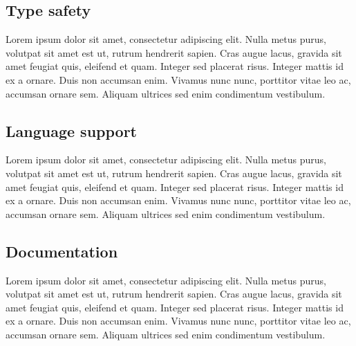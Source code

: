 \documentclass[../report.tex]{subfiles}
\begin{document}
\subsection{Type safety}

Lorem ipsum dolor sit amet, consectetur adipiscing elit. Nulla metus purus, volutpat sit amet est ut, rutrum hendrerit sapien. Cras augue lacus, gravida sit amet feugiat quis, eleifend et quam. Integer sed placerat risus. Integer mattis id ex a ornare. Duis non accumsan enim. Vivamus nunc nunc, porttitor vitae leo ac, accumsan ornare sem. Aliquam ultrices sed enim condimentum vestibulum.

\subsection{Language support}

Lorem ipsum dolor sit amet, consectetur adipiscing elit. Nulla metus purus, volutpat sit amet est ut, rutrum hendrerit sapien. Cras augue lacus, gravida sit amet feugiat quis, eleifend et quam. Integer sed placerat risus. Integer mattis id ex a ornare. Duis non accumsan enim. Vivamus nunc nunc, porttitor vitae leo ac, accumsan ornare sem. Aliquam ultrices sed enim condimentum vestibulum.

\subsection{Documentation}

Lorem ipsum dolor sit amet, consectetur adipiscing elit. Nulla metus purus, volutpat sit amet est ut, rutrum hendrerit sapien. Cras augue lacus, gravida sit amet feugiat quis, eleifend et quam. Integer sed placerat risus. Integer mattis id ex a ornare. Duis non accumsan enim. Vivamus nunc nunc, porttitor vitae leo ac, accumsan ornare sem. Aliquam ultrices sed enim condimentum vestibulum.
\end{document}
